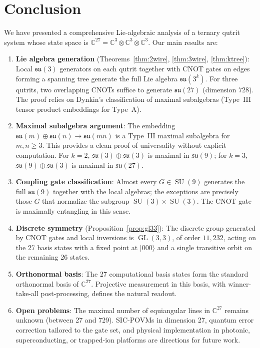 \documentclass[12pt,a4paper]{article}
\newcommand{\GL}{\operatorname{GL}}
\newcommand{\SU}{\operatorname{SU}}
\begin{document}
\section{Conclusion}

We have presented a comprehensive Lie-algebraic analysis of a ternary
qutrit system whose state space is $\mathbb{C}^{27} = \mathbb{C}^3 \otimes
\mathbb{C}^3 \otimes \mathbb{C}^3$. Our main results are:

\begin{enumerate}
\item \textbf{Lie algebra generation} (Theorems~\ref{thm:2wire},
\ref{thm:3wire}, \ref{thm:ktree}): Local $\mathfrak{su}(3)$ generators
on each qutrit together with CNOT gates on edges forming a spanning tree
generate the full Lie algebra $\mathfrak{su}(3^k)$. For three qutrits,
two overlapping CNOTs suffice to generate $\mathfrak{su}(27)$ (dimension
728). The proof relies on Dynkin's classification of maximal subalgebras
(Type~III tensor product embeddings for Type~A).

\item \textbf{Maximal subalgebra argument}: The embedding
$\mathfrak{su}(m) \oplus \mathfrak{su}(n) \to \mathfrak{su}(mn)$
is a Type~III maximal subalgebra for $m,n \ge 3$.
This provides a clean proof of universality without explicit computation.
For $k=2$, $\mathfrak{su}(3) \oplus \mathfrak{su}(3)$ is maximal in
$\mathfrak{su}(9)$; for $k=3$, $\mathfrak{su}(9) \oplus \mathfrak{su}(3)$
is maximal in $\mathfrak{su}(27)$.

\item \textbf{Coupling gate classification}: Almost every $G \in \SU(9)$
generates the full $\mathfrak{su}(9)$ together with the local algebras;
the exceptions are precisely those $G$ that normalize the subgroup
$\SU(3)\times\SU(3)$. The CNOT gate is maximally entangling in this sense.

\item \textbf{Discrete symmetry} (Proposition~\ref{prop:gl33}): The
discrete group generated by CNOT gates and local inversions is
$\GL(3,3)$, of order $11{,}232$, acting on the 27 basis states with
a fixed point at $|000\rangle$ and a single transitive orbit on the
remaining 26 states.

\item \textbf{Orthonormal basis}: The 27 computational basis states form
the standard orthonormal basis of $\mathbb{C}^{27}$. Projective measurement
in this basis, with winner-take-all post-processing, defines the natural
readout.

\item \textbf{Open problems}: The maximal number of equiangular lines in
$\mathbb{C}^{27}$ remains unknown (between 27 and 729). SIC-POVMs in
dimension 27, quantum error correction tailored to the gate set, and
physical implementation in photonic, superconducting, or trapped-ion
platforms are directions for future work.
\end{enumerate}
\end{document}
